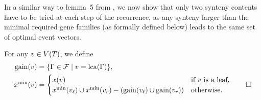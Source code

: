 In a similar way to lemma~5 from \textcite{Delabre2020EvolutionSegmentalDuplications}, we now show that only two synteny contents have to be tried at each step of the recurrence, as any synteny larger than the minimal required gene families (as formally defined below) leads to the same set of optimal event vectors.

\begin{definition}
    For any \(v \in V(T)\), we define \begin{align*}
        \mathrm{gain}(v) &= \{\Gamma \in \mathcal{F} \mid v = \mathrm{lca}(\Gamma)\}, \\
        x^{\mathrm{min}}(v) &= \begin{cases}
            x(v) & \text{if } v \text{ is a leaf,} \\
            x^{\mathrm{min}}(v_\mathit{\ell}) \cup x^{\mathrm{min}}(v_r) - (\mathrm{gain}(v_\mathit{\ell}) \cup \mathrm{gain}(v_r)) & \text{otherwise.} 
        \end{cases}
        \qedhere
    \end{align*}
\end{definition}

